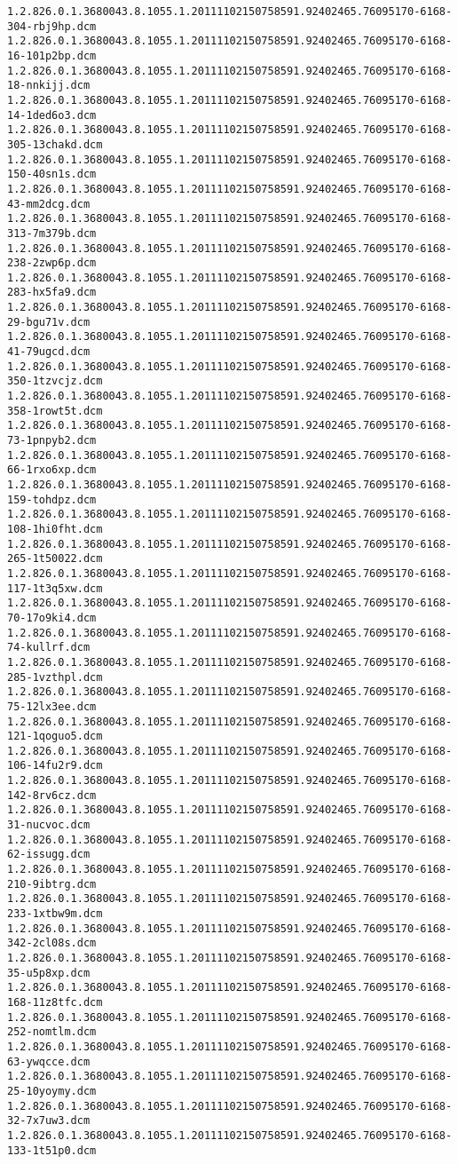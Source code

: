 \begin{lstlisting}
1.2.826.0.1.3680043.8.1055.1.20111102150758591.92402465.76095170-6168-304-rbj9hp.dcm 1.2.826.0.1.3680043.8.1055.1.20111102150758591.92402465.76095170-6168-16-101p2bp.dcm 1.2.826.0.1.3680043.8.1055.1.20111102150758591.92402465.76095170-6168-18-nnkijj.dcm 1.2.826.0.1.3680043.8.1055.1.20111102150758591.92402465.76095170-6168-14-1ded6o3.dcm 1.2.826.0.1.3680043.8.1055.1.20111102150758591.92402465.76095170-6168-305-13chakd.dcm 1.2.826.0.1.3680043.8.1055.1.20111102150758591.92402465.76095170-6168-150-40sn1s.dcm 1.2.826.0.1.3680043.8.1055.1.20111102150758591.92402465.76095170-6168-43-mm2dcg.dcm 1.2.826.0.1.3680043.8.1055.1.20111102150758591.92402465.76095170-6168-313-7m379b.dcm 1.2.826.0.1.3680043.8.1055.1.20111102150758591.92402465.76095170-6168-238-2zwp6p.dcm 1.2.826.0.1.3680043.8.1055.1.20111102150758591.92402465.76095170-6168-283-hx5fa9.dcm 1.2.826.0.1.3680043.8.1055.1.20111102150758591.92402465.76095170-6168-29-bgu71v.dcm 1.2.826.0.1.3680043.8.1055.1.20111102150758591.92402465.76095170-6168-41-79ugcd.dcm 1.2.826.0.1.3680043.8.1055.1.20111102150758591.92402465.76095170-6168-350-1tzvcjz.dcm 1.2.826.0.1.3680043.8.1055.1.20111102150758591.92402465.76095170-6168-358-1rowt5t.dcm 1.2.826.0.1.3680043.8.1055.1.20111102150758591.92402465.76095170-6168-73-1pnpyb2.dcm 1.2.826.0.1.3680043.8.1055.1.20111102150758591.92402465.76095170-6168-66-1rxo6xp.dcm 1.2.826.0.1.3680043.8.1055.1.20111102150758591.92402465.76095170-6168-159-tohdpz.dcm 1.2.826.0.1.3680043.8.1055.1.20111102150758591.92402465.76095170-6168-108-1hi0fht.dcm 1.2.826.0.1.3680043.8.1055.1.20111102150758591.92402465.76095170-6168-265-1t50022.dcm 1.2.826.0.1.3680043.8.1055.1.20111102150758591.92402465.76095170-6168-117-1t3q5xw.dcm 1.2.826.0.1.3680043.8.1055.1.20111102150758591.92402465.76095170-6168-70-17o9ki4.dcm 1.2.826.0.1.3680043.8.1055.1.20111102150758591.92402465.76095170-6168-74-kullrf.dcm 1.2.826.0.1.3680043.8.1055.1.20111102150758591.92402465.76095170-6168-285-1vzthpl.dcm 1.2.826.0.1.3680043.8.1055.1.20111102150758591.92402465.76095170-6168-75-12lx3ee.dcm 1.2.826.0.1.3680043.8.1055.1.20111102150758591.92402465.76095170-6168-121-1qoguo5.dcm 1.2.826.0.1.3680043.8.1055.1.20111102150758591.92402465.76095170-6168-106-14fu2r9.dcm 1.2.826.0.1.3680043.8.1055.1.20111102150758591.92402465.76095170-6168-142-8rv6cz.dcm 1.2.826.0.1.3680043.8.1055.1.20111102150758591.92402465.76095170-6168-31-nucvoc.dcm 1.2.826.0.1.3680043.8.1055.1.20111102150758591.92402465.76095170-6168-62-issugg.dcm 1.2.826.0.1.3680043.8.1055.1.20111102150758591.92402465.76095170-6168-210-9ibtrg.dcm 1.2.826.0.1.3680043.8.1055.1.20111102150758591.92402465.76095170-6168-233-1xtbw9m.dcm 1.2.826.0.1.3680043.8.1055.1.20111102150758591.92402465.76095170-6168-342-2cl08s.dcm 1.2.826.0.1.3680043.8.1055.1.20111102150758591.92402465.76095170-6168-35-u5p8xp.dcm 1.2.826.0.1.3680043.8.1055.1.20111102150758591.92402465.76095170-6168-168-11z8tfc.dcm 1.2.826.0.1.3680043.8.1055.1.20111102150758591.92402465.76095170-6168-252-nomtlm.dcm 1.2.826.0.1.3680043.8.1055.1.20111102150758591.92402465.76095170-6168-63-ywqcce.dcm 1.2.826.0.1.3680043.8.1055.1.20111102150758591.92402465.76095170-6168-25-10yoymy.dcm 1.2.826.0.1.3680043.8.1055.1.20111102150758591.92402465.76095170-6168-32-7x7uw3.dcm 1.2.826.0.1.3680043.8.1055.1.20111102150758591.92402465.76095170-6168-133-1t51p0.dcm 
\end{lstlisting}
